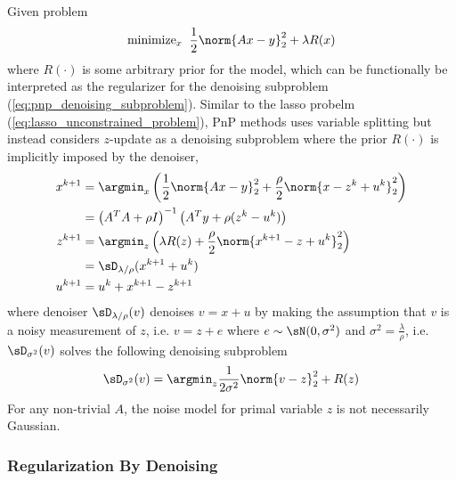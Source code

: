 \documentclass[../writeup.tex]{subfiles}
\begin{document}
Given problem 
\begin{align}
    \text{minimize}_x \;\;
        \frac{1}{2} \norm{Ax-y}_2^2 + \lambda R(x)
\end{align}
where $R(\cdot)$ is some arbitrary prior for the model, which can be functionally be interpreted as the regularizer for the denoising subproblem (\ref{eq:pnp_denoising_subproblem}). Similar to the lasso probelm (\ref{eq:lasso_unconstrained_problem}), PnP methods uses variable splitting but instead considers $z$-update as a denoising subproblem where the prior $R(\cdot)$ is implicitly imposed by the denoiser,
\begin{align} 
    x^{k+1}
        &= \argmin_x \left(
            \frac{1}{2}\norm{Ax-y}_2^2 + \frac{\rho}{2} \norm{x - z^k + u^k}_2^2
        \right) \\ 
        &= \left( A^TA + \rho I \right)^{-1} \left( A^Ty + \rho(z^{k} - u^k) \right) \\
    z^{k+1}
        &= \argmin_z \left(
            \lambda R(z) + \frac{\rho}{2} \norm{x^{k+1} - z + u^k }_2^2
        \right) \\ 
        &= \sD_{\lambda/\rho}( x^{k+1} + u^k ) \\
    u^{k+1}
        &= u^k + x^{k+1} - z^{k+1}
    \label{eq:pnp_admm_update_equations}
\end{align}
where denoiser $\sD_{\lambda/\rho}(v)$ denoises $v = x + u$ by making the assumption that $v$ is a noisy measurement of $z$, i.e. $v = z+e$ where $e\sim \sN(0,\sigma^2)$ and $\sigma^2 = \frac{\lambda}{\rho}$, i.e. $\sD_{\sigma^2}(v)$ solves the following denoising subproblem
\begin{align}
    \sD_{\sigma^2}(v)
        = \argmin_z
        \frac{1}{2 \sigma^2 } \norm{ v-z }_2^2 + R(z)
        \label{eq:pnp_denoising_subproblem}
\end{align}
For any non-trivial $A$, the noise model for primal variable $z$ is not necessarily Gaussian. 

\subsubsection{Regularization By Denoising}
\end{document}
